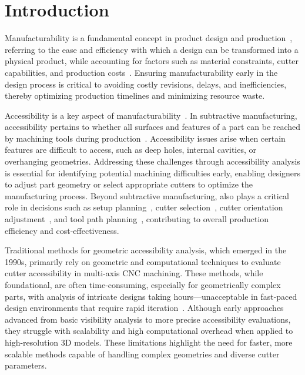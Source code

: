 
\section{Introduction}
\label{sec:intro}



Manufacturability is a fundamental concept in product design and production~\cite{shukor2009manufacturability,gupta1997automated}, referring to the ease and efficiency with which a design can be transformed into a physical product, while accounting for factors such as material constraints, cutter capabilities, and production costs~\cite{joshi1988graph,li2006machinability,hoefer2017automated}.
Ensuring manufacturability early in the design process is critical to avoiding costly revisions, delays, and inefficiencies, thereby optimizing production timelines and minimizing resource waste.

Accessibility is a key aspect of manufacturability~\cite{elber1994accessibility,spyridi1990accessibility}.
In subtractive manufacturing, accessibility pertains to whether all surfaces and features of a part can be reached by machining tools during production~\cite{zhang2020manufacturability}. Accessibility issues arise when certain features are difficult to access, such as deep holes, internal cavities, or overhanging geometries. Addressing these challenges through accessibility analysis is essential for identifying potential machining difficulties early, enabling designers to adjust part geometry or select appropriate cutters to optimize the manufacturing process. Beyond subtractive manufacturing, \accessAna also plays a critical role in decisions such as setup planning~\cite{zhong2023vasco}, cutter selection~\cite{athawale2010topsis}, cutter orientation adjustment~\cite{mahdavi2020vdac}, and tool path planning~\cite{balasubramaniam2003collision}, contributing to overall production efficiency and cost-effectiveness.



Traditional methods for geometric accessibility analysis, which emerged in the 1990s, primarily rely on geometric and computational techniques to evaluate cutter accessibility in multi-axis CNC machining. These methods, while foundational, are often time-consuming, especially for geometrically complex parts, with analysis of intricate designs taking hours—unacceptable in fast-paced design environments that require rapid iteration~\cite{dai2018support}. 
Although early approaches advanced from basic visibility analysis to more precise accessibility evaluations, they struggle with scalability and high computational overhead when applied to high-resolution 3D models. These limitations highlight the need for faster, more scalable methods capable of handling complex geometries and diverse cutter parameters.

